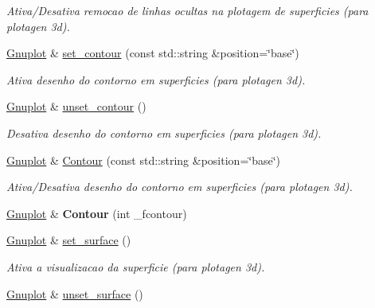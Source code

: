 \begin{DoxyCompactItemize}
\begin{DoxyCompactList}\small\item\em Ativa/\-Desativa remocao de linhas ocultas na plotagem de superficies (para plotagen 3d). \end{DoxyCompactList}\item 
\hyperlink{classGnuplot}{Gnuplot} \& \hyperlink{classGnuplot_af845efc728a90d7e10de764eff0b2423}{set\-\_\-contour} (const std\-::string \&position=\char`\"{}base\char`\"{})
\begin{DoxyCompactList}\small\item\em Ativa desenho do contorno em superficies (para plotagen 3d). \end{DoxyCompactList}\item 
\hypertarget{classGnuplot_a39d10e6ce85875939a9c594d132a10d7}{\hyperlink{classGnuplot}{Gnuplot} \& \hyperlink{classGnuplot_a39d10e6ce85875939a9c594d132a10d7}{unset\-\_\-contour} ()}\label{classGnuplot_a39d10e6ce85875939a9c594d132a10d7}

\begin{DoxyCompactList}\small\item\em Desativa desenho do contorno em superficies (para plotagen 3d). \end{DoxyCompactList}\item 
\hyperlink{classGnuplot}{Gnuplot} \& \hyperlink{classGnuplot_a826a0f860cd984748f8c7ee80228fce7}{Contour} (const std\-::string \&position=\char`\"{}base\char`\"{})
\begin{DoxyCompactList}\small\item\em Ativa/\-Desativa desenho do contorno em superficies (para plotagen 3d). \end{DoxyCompactList}\item 
\hypertarget{classGnuplot_ab2918e5653c9d421bf924d7dc2467429}{\hyperlink{classGnuplot}{Gnuplot} \& {\bfseries Contour} (int \-\_\-fcontour)}\label{classGnuplot_ab2918e5653c9d421bf924d7dc2467429}

\item 
\hypertarget{classGnuplot_a0e36dcd81618234c6cdd135a9e1eee2b}{\hyperlink{classGnuplot}{Gnuplot} \& \hyperlink{classGnuplot_a0e36dcd81618234c6cdd135a9e1eee2b}{set\-\_\-surface} ()}\label{classGnuplot_a0e36dcd81618234c6cdd135a9e1eee2b}

\begin{DoxyCompactList}\small\item\em Ativa a visualizacao da superficie (para plotagen 3d). \end{DoxyCompactList}\item 
\hypertarget{classGnuplot_a805f1807c9b3a0a6745d66fa1729e3be}{\hyperlink{classGnuplot}{Gnuplot} \& \hyperlink{classGnuplot_a805f1807c9b3a0a6745d66fa1729e3be}{unset\-\_\-surface} ()}\label{classGnuplot_a805f1807c9b3a0a6745d66fa1729e3be}


\end{DoxyCompactItemize}
